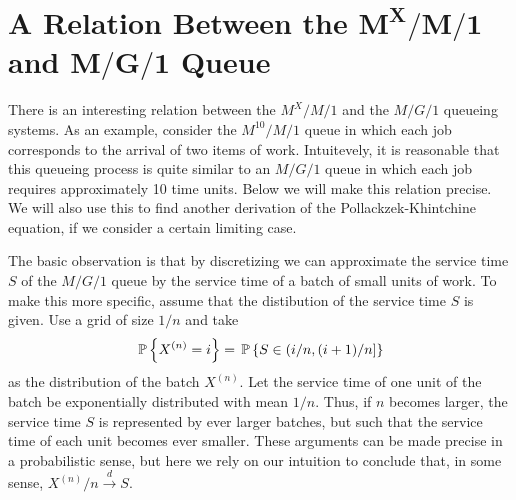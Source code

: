 \section
[A Relation Between the $M^X/M/1$ and $M/G/1$  Queue]
{A Relation Between the $\mathbf{M^X/M/1}$ and $\mathbf{M/G/1}$  Queue}
\label{sec:relat-batch-queu}


There is an interesting relation between the $M^X/M/1$ and the $M/G/1$
queueing systems. As an example, consider the $M^{10}/M/1$ queue in
which each job corresponds to the arrival of two items of
work. Intuitevely, it is reasonable that this queueing process is
quite similar to an $M/G/1$ queue in which each job requires
approximately 10 time units. Below we will make this relation
precise. We will also use this to find another derivation of the
Pollackzek-Khintchine equation, if we consider a certain limiting
case.


The basic observation is that by discretizing we can approximate the
service time $S$ of the $M/G/1$ queue by the service time of a batch
of small units of work. To make this more specific, assume that the
distibution of the service time $S$ is given. Use a grid of size $1/n$
and take
\begin{equation}\label{eq:69}
  \P{X^{(n)} = i} = \P{ S\in(i/n, (i+1)/n]}
\end{equation}
as the distribution of the batch $X^{(n)}$. Let the service time of
one unit of the batch be exponentially distributed with mean $1/n$.
Thus, if $n$ becomes larger, the service time $S$ is represented by
ever larger batches, but such that the service time of each unit
becomes ever smaller. These arguments can be made precise in a
probabilistic sense, but here we rely on our intuition to conclude
that, in some sense, $X^{(n)}/n \stackrel{d}{\to} S$. 

